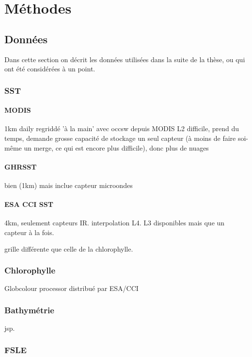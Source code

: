 \documentclass[index]{subfiles}
\begin{document}
\chapter{Méthodes}
\label{chp:méthodes}

\section{Données}

Dans cette section on décrit les données utilisées dans la suite de la thèse, ou qui ont été considérées à un point.

\subsection{SST}

\subsubsection{MODIS}
1km daily
regriddé 'à la main' avec occsw depuis MODIS L2
difficile, prend du temps, demande grosse capacité de stockage
un seul capteur (à moins de faire soi-même un merge, ce qui est encore plus difficile), donc plus de nuages

\subsubsection{GHRSST}
bien (1km) mais inclue capteur microondes

\subsubsection{ESA CCI SST}
4km, seulement capteurs IR.
interpolation L4.
L3 disponibles mais que un capteur à la fois.

grille différente que celle de la chlorophylle.

\subsection{Chlorophylle}

Globcolour processor
distribué par ESA/CCI

\subsection{Bathymétrie}

jsp.

\subsection{FSLE}
\end{document}
